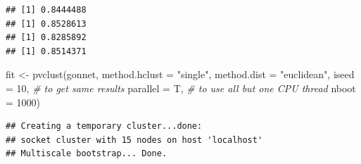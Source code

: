 \documentclass[12pt]{article}
\newenvironment{Shaded}{\begin{snugshade}}{\end{snugshade}}
\newcommand{\AttributeTok}[1]{\textcolor[rgb]{0.77,0.63,0.00}{#1}}
\newcommand{\CommentTok}[1]{\textcolor[rgb]{0.56,0.35,0.01}{\textit{#1}}}
\newcommand{\DecValTok}[1]{\textcolor[rgb]{0.00,0.00,0.81}{#1}}
\newcommand{\FunctionTok}[1]{\textcolor[rgb]{0.00,0.00,0.00}{#1}}
\newcommand{\NormalTok}[1]{#1}
\newcommand{\OtherTok}[1]{\textcolor[rgb]{0.56,0.35,0.01}{#1}}
\newcommand{\SpecialCharTok}[1]{\textcolor[rgb]{0.00,0.00,0.00}{#1}}
\newcommand{\StringTok}[1]{\textcolor[rgb]{0.31,0.60,0.02}{#1}}
\begin{document}
\begin{Shaded}
\end{Shaded}

\begin{verbatim}
## [1] 0.8444488
## [1] 0.8528613
## [1] 0.8285892
## [1] 0.8514371
\end{verbatim}

\begin{Shaded}
\begin{Highlighting}[]
\NormalTok{fit }\OtherTok{\textless{}{-}} 
  \FunctionTok{pvclust}\NormalTok{(gonnet, }
  \AttributeTok{method.hclust =} \StringTok{"single"}\NormalTok{,}
  \AttributeTok{method.dist =} \StringTok{"euclidean"}\NormalTok{,}
  \AttributeTok{iseed =} \DecValTok{10}\NormalTok{, }\CommentTok{\# to get same results}
  \AttributeTok{parallel =}\NormalTok{ T, }\CommentTok{\# to use all but one CPU thread}
  \AttributeTok{nboot =} \DecValTok{1000}\NormalTok{) }
\end{Highlighting}
\end{Shaded}

\begin{verbatim}
## Creating a temporary cluster...done:
## socket cluster with 15 nodes on host 'localhost'
## Multiscale bootstrap... Done.
\end{verbatim}
\end{document}
